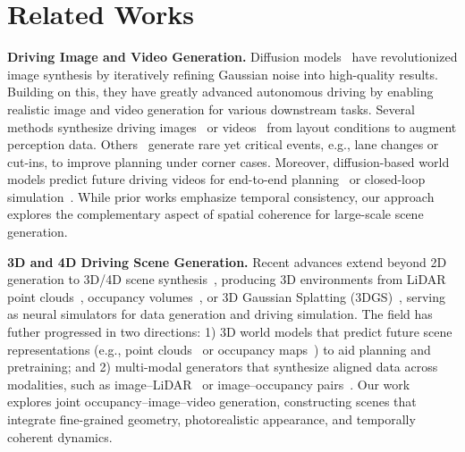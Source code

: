 

\section{Related Works}
\noindent\textbf{Driving Image and Video Generation.}
Diffusion models~\cite{DDPM, DDIM, LDM, videoLDM} have revolutionized image synthesis by iteratively refining Gaussian noise into high-quality results. Building on this, they have greatly advanced autonomous driving by enabling realistic image and video generation for various downstream tasks. Several methods synthesize driving images~\cite{MagicDrive, BEVGen, BEVControl, Neuralfloors, NeuralFloors++} or videos~\cite{Vista, DriveDreamer, DrivingDiffusion, Panacea, SubjectDrive, MagicDriveDiT, SyntheOcc, CogDriving, DriveScape, DiVE, UniMLVG, CoGen, Glad} from layout conditions to augment perception data. Others~\cite{DriveDreamer-2, DriveDreamer4D} generate rare yet critical events, e.g., lane changes or cut-ins, to improve planning under corner cases. Moreover, diffusion-based world models predict future driving videos for end-to-end planning~\cite{Drive-WM, Delphi, UMGen} or closed-loop simulation~\cite{DriveArena, DreamForge, DrivingSphere, ReconDreamer, SceneCrafter, Stag-1}. While prior works emphasize temporal consistency, our approach explores the complementary aspect of spatial coherence for large-scale scene generation.


\noindent\textbf{3D and 4D Driving Scene Generation.}
Recent advances extend beyond 2D generation to 3D/4D scene synthesis~\cite{kong20253d}, producing 3D environments from LiDAR point clouds~\cite{LiDARGen, Lidarsnow, UltraLiDAR, LiDM, Lidardm, RangeLDM, Text2LiDAR, TYP, LiDARCrafter, liang2025learning}, occupancy volumes~\cite{PDD, SSD, SemCity, UrbanDiff, DQFormer, SCube, XCube, DynamicCity}, or 3D Gaussian Splatting (3DGS)~\cite{StreetGaussian, MagicdDrive3D, DreamDrive, STORM, StreetCrafter, DiST-4D, chen2023neusg, chen2024vcr}, serving as neural simulators for data generation and driving simulation.
The field has futher progressed in two directions: 1) 3D world models that predict future scene representations (e.g., point clouds~\cite{Copilot4D, ViDAR, UnO} or occupancy maps~\cite{OccWorld, OccSora, DriveWorld, DriveOccWorld, DOME, IR-WM}) to aid planning and pretraining; and 2) multi-modal generators that synthesize aligned data across modalities, such as image–LiDAR~\cite{X-Drive, HoloDrive} or image–occupancy pairs~\cite{WoVoGen, UniScene, DrivingSphere}.
Our work explores joint occupancy–image–video generation, constructing scenes that integrate fine-grained geometry, photorealistic appearance, and temporally coherent dynamics.


